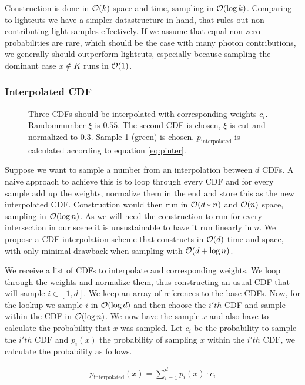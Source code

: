 Construction is done in $\mathcal{O}(k)$ space and time, sampling in $\mathcal{O}(\log{k})$. Comparing to lightcuts we have a simpler datastructure in hand, that rules out non contributing light samples effectively. If we assume that equal non-zero probabilities are rare, which should be the case with many photon contributions, we generally should outperform lightcuts, especially because sampling the dominant case $x \notin K$ runs in $\mathcal{O}(1)$. 

\subsubsection{Interpolated CDF}
\label{sec:intcdf}
\begin{figure}[htb] 
	\centering
    
    \caption{Three CDFs should be interpolated with corresponding weights $c_i$. Randomnumber $\xi$ is $0.55$. The second CDF is chosen, $\xi$ is cut and normalized to $0.3$. Sample 1 (green) is chosen. $p_{\text{interpolated}}$ is calculated according to equation \ref{eq:pinter}.} 
    \label{fig:interpolatedCDF}
\end{figure}

Suppose we want to sample a number from an interpolation between $d$ CDFs. A naive approach to achieve this is to loop through every CDF and for every sample add up the weights, normalize them in the end and store this as the new interpolated CDF. Construction would then run in $\mathcal{O}(d * n)$ and $\mathcal{O}(n)$ space, sampling in $\mathcal{O}(\log{n})$. As we will need the construction to run for every intersection in our scene it is unsustainable to have it run linearly in $n$. We propose a CDF interpolation scheme that constructs in $\mathcal{O}(d)$ time and space, with only minimal drawback when sampling with $\mathcal{O}(d + \log{n})$.

We receive a list of CDFs to interpolate and corresponding weights. We loop through the weights and normalize them, thus constructing an usual CDF that will sample $i \in [1,d]$. We keep an array of references to the base CDFs. Now, for the lookup we sample $i$ in $\mathcal{O}(\log{d})$ and then choose the $i'th$ CDF and sample within the CDF in $\mathcal{O}(\log{n})$. We now have the sample $x$ and also have to calculate the probability that $x$ was sampled. Let $c_i$ be the probability to sample the $i'th$ CDF and $p_i(x)$ the probability of sampling $x$ within the $i'th$ CDF, we calculate the probability as follows.

\begin{align}\label{eq:pinter}
    p_{\text{interpolated}}(x) = \sum_{i=1}^{d}p_{i}(x) \cdot c_i
\end{align}

